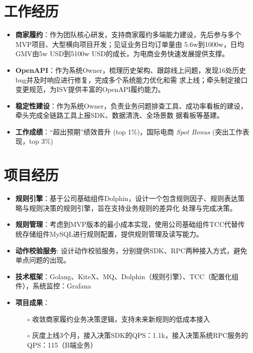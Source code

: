 \documentclass{resume}
\begin{document}
\section{工作经历}
\begin{itemize}[parsep=0.3ex] \normalsize
    \item \textbf{商家履约}：作为团队核心研发，支持商家履约多端能力建设，先后参与多个MVP项目、大型横向项目开发；见证业务日均订单量由
    5.6w到1000w，日均GMV由5w USD到5100w USD的成长，为电商业务快速发展提供支撑。
    \item \textbf{OpenAPI}：作为系统Owner，梳理历史架构、跟踪线上问题，发现16处历史bug并及时响应进行修复，完成多个系统能力优化和需
    求上线；牵头制定接口变更规范，为ISV提供丰富的OpenAPI履约能力。
    \item \textbf{稳定性建设}：作为系统Owner，负责业务问题排查工具、成功率看板的建设，牵头完成全链路工具上报SDK、数据清洗、全场景数
    据看板等基建。
    \item \textbf{工作成绩}：“超出预期”绩效晋升 (top 1\%)，国际电商 \textit{Spot Bonus} (突出工作表现，top 3\%)
\end{itemize}

\section{项目经历}
\begin{itemize}[parsep=0.3ex] \normalsize
    \item \textbf{规则引擎}：基于公司基础组件Dolphin，设计一个包含规则因子、规则表达策略与规则决策的规则引擎，旨在支持业务规则的差异化
    处理与完成决策。
    \item \textbf{规则管理}：考虑到MVP版本的最小成本实现，使用公司基础组件TCC代替传统存储组件MySQL进行规则配置，提供规则管理及读写能力。
    \item \textbf{动作校验服务}: 设计动作校验服务，分别提供SDK、RPC两种接入方式，避免单点问题的出现。
    \item \textbf{技术框架}：Golang、KiteX、MQ、Dolphin（规则引擎）、TCC（配置化组件），系统监控：Grafana
    \item \textbf{项目成果}：
      \begin{itemize}
        \item[$\circ$] 收敛商家履约业务决策逻辑，支持未来新规则的低成本接入
        \item[$\circ$] 灰度上线3个月，接入决策SDK的QPS：1.1k，接入决策系统RPC服务的QPS：115（B端业务）
      \end{itemize}
\end{itemize}
\end{document}
